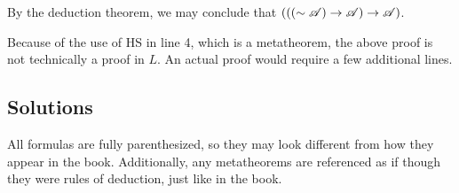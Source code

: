 \begin{proposition}
\begin{enumerate}[label=(\alph*)]
      By the deduction theorem, we may conclude that \((((\sim\mathscr{A}) \rightarrow \mathscr{A}) \rightarrow \mathscr{A})\).

      \note{} Because of the use of HS in line 4, which is a metatheorem, the above proof is not technically a proof in \(L\). An actual proof would require a few additional lines.
  \end{enumerate}
\end{proposition}

\subsection*{Solutions}

\note All formulas are fully parenthesized, so they may look different from how they appear in the book. Additionally, any metatheorems are referenced as if though they were rules of deduction, just like in the book.

